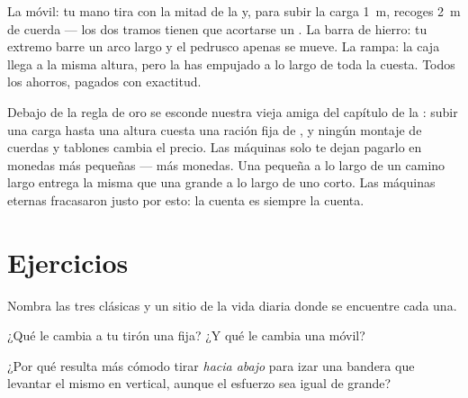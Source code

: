 \begin{example}\label{ex:g5:simple-machines:check}
La  móvil: tu mano tira con la mitad de la  y, para subir
la carga \qty{1}{m}, recoges \qty{2}{m} de cuerda --- los dos tramos
tienen que acortarse un . La barra de hierro: tu extremo barre un
arco largo y el pedrusco apenas se mueve. La rampa: la caja llega a la
misma altura, pero la has empujado a lo largo de toda la cuesta. Todos
los ahorros, pagados con exactitud.
\end{example}

\begin{remark}\label{rem:g5:simple-machines:whygolden}
Debajo de la regla de oro se esconde nuestra vieja amiga del capítulo
de la : subir una carga hasta una altura cuesta una ración
fija de , y ningún montaje de cuerdas y tablones cambia el
precio. Las máquinas solo te dejan pagarlo en monedas más pequeñas ---
más monedas. Una  pequeña a lo largo de un camino largo entrega
la misma  que una  grande a lo largo de uno corto.
Las máquinas eternas fracasaron justo por esto: la cuenta es siempre
la cuenta.
\end{remark}

\section{Ejercicios}

\begin{exercise}[$\star$]\label{exo:g5:simple-machines:1}
Nombra las tres  clásicas y un sitio de la vida
diaria donde se encuentre cada una.
\end{exercise}

\begin{exercise}[$\star$]\label{exo:g5:simple-machines:2}
¿Qué le cambia a tu tirón una  fija? ¿Y qué le cambia una
 móvil?
\end{exercise}

\begin{exercise}[$\star$]\label{exo:g5:simple-machines:3}
¿Por qué resulta más cómodo tirar \emph{hacia abajo} para izar una
bandera que levantar el mismo  en vertical, aunque el esfuerzo
sea igual de grande?
\end{exercise}

